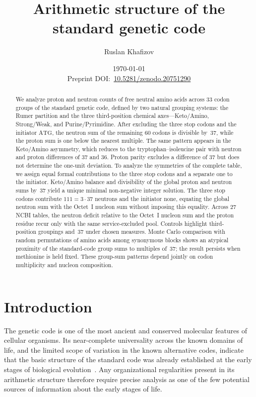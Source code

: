 \documentclass[11pt,a4paper]{article}
\title{Arithmetic structure of the standard genetic code}
\author{Ruslan Khafizov}
\date{\today\\[1ex]
\small Preprint DOI:~\href{https://doi.org/10.5281/zenodo.20751290}{10.5281/zenodo.20751290}}
\renewcommand{\_}{\origunderscore\allowbreak}
\begin{document}
\maketitle

\begin{abstract}
We analyze proton and neutron counts of free neutral amino acids
across $33$ codon groups of the standard genetic code, defined
by two natural grouping systems: the Rumer partition and the
three third-position chemical axes---Keto/Amino, Strong/Weak,
and Purine/Pyrimidine. After excluding the three stop codons and the initiator
$\mathrm{ATG}$, the neutron sum of the remaining $60$ codons
is divisible by~$37$, while the proton sum is one below
the nearest multiple. The same pattern appears in the
Keto/Amino asymmetry, which reduces to the tryptophan--isoleucine
pair with neutron and proton differences of $37$ and $36$.
Proton parity excludes a difference of $37$
but does not determine the one-unit deviation. To analyze the symmetries of the complete table, we assign
equal formal contributions to the three stop codons
and a separate one to the initiator. Keto/Amino
balance and divisibility of the global proton and neutron
sums by~$37$ yield a unique minimal non-negative integer
solution. The three stop codons contribute $111=3\cdot37$ neutrons
and the initiator none, equating the global neutron sum
with the Octet~I nucleon sum without imposing this equality. Across $27$ NCBI tables, the neutron deficit relative
to the Octet~I nucleon sum and the proton residue
recur only with the same service-excluded pool.
Controls highlight third-position groupings and~$37$
under chosen measures. Monte Carlo comparison with random permutations of amino acids
among synonymous blocks shows an atypical proximity of the
standard-code group sums to multiples of~$37$; the result persists
when methionine is held fixed. These group-sum patterns depend
jointly on codon multiplicity and nucleon composition.
\end{abstract}

\tableofcontents

\section{Introduction}
\label{sec:introduction}

The genetic code is one of the most ancient and
conserved molecular features of cellular organisms.
Its near-complete universality across the known
domains of life, and the limited scope of variation
in the known alternative codes, indicate that the
basic structure of the standard code was already
established at the early stages of biological
evolution~\cite{crick1968}. Any organizational regularities present in its arithmetic structure therefore require precise analysis as one of the few potential sources of information about the early stages of life.
\end{document}
